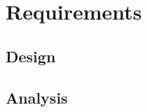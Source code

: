\chapter{Requirements}

\section{Design}

\lipsum[10-20]
\blindenumerate[12]

\section{Analysis}

\lipsum[17-29]
